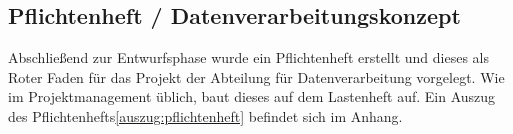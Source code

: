 \subsection{Pflichtenheft / Datenverarbeitungskonzept}
Abschließend zur Entwurfsphase wurde ein Pflichtenheft erstellt und dieses als
Roter Faden für das Projekt der Abteilung für Datenverarbeitung vorgelegt. Wie im
Projektmanagement üblich, baut dieses auf dem Lastenheft auf.
Ein Auszug des Pflichtenhefts\ref{auszug:pflichtenheft} befindet sich im Anhang.
